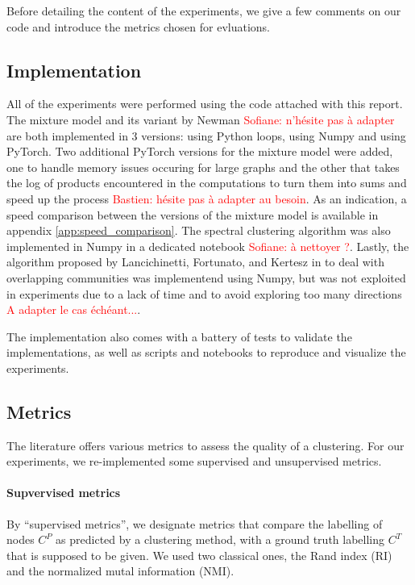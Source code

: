 \documentclass[10pt]{article}
\begin{document}
Before detailing the content of the experiments, we give a few comments on our code and introduce the metrics chosen for evluations.

\subsection{Implementation}

All of the experiments were performed using the code attached with this report. The mixture model and its variant by Newman \textcolor{red}{Sofiane: n'hésite pas à adapter} are both implemented in 3 versions: using Python loops, using Numpy and using PyTorch. Two additional PyTorch versions for the mixture model were added, one to handle memory issues occuring for large graphs and the other that takes the log of products encountered in the computations to turn them into sums and speed up the process \textcolor{red}{Bastien: hésite pas à adapter au besoin}. As an indication, a speed comparison between the versions of the mixture model is available in appendix \ref{app:speed_comparison}. The spectral clustering algorithm was also implemented in Numpy in a dedicated notebook \textcolor{red}{Sofiane: à nettoyer ?}. Lastly, the algorithm proposed by Lancichinetti, Fortunato, and Kertesz in \cite{lancichinetti_detecting_2009} to deal with overlapping communities was implementend using Numpy, but was not exploited in experiments due to a lack of time and to avoid exploring too many directions \textcolor{red}{A adapter le cas échéant...}.

The implementation also comes with a battery of tests to validate the implementations, as well as scripts and notebooks to reproduce and visualize the experiments.

\subsection{Metrics}
    \label{subsec:metrics}

The literature offers various metrics to assess the quality of a clustering. For our experiments, we re-implemented some supervised and unsupervised metrics.

\paragraph{Supvervised metrics} By ``supervised metrics'', we designate metrics that compare the labelling of nodes $C^P$ as predicted by a clustering method, with a ground truth labelling $C^T$ that is supposed to be given. We used two classical ones, the Rand index (RI) and the normalized mutal information (NMI).
\end{document}
